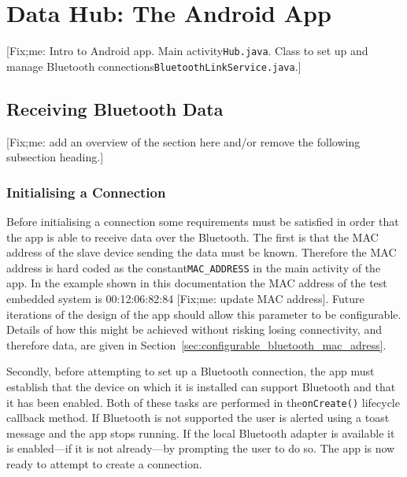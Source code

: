 \documentclass[11pt, a4paper, oneside, english]{scrbook}
\begin{document}
\chapter{Data Hub: The Android App} %
\label{cha:data_hub}
[Fix;me: Intro to Android app. Main activity\lstinline{Hub.java}. Class to set up and manage Bluetooth connections\lstinline{BluetoothLinkService.java}.]
\section{Receiving Bluetooth Data} %
\label{sec:receiving_bluetooth_data}
[Fix;me: add an overview of the section here and/or remove the following subsection heading.]
\subsection{Initialising a Connection} %
\label{sub:initialising_a_connection}
Before initialising a connection some requirements must be satisfied in order that the app is able to receive data over the Bluetooth. The first is that the MAC address of the slave device sending the data must be known. Therefore the MAC address is hard coded as the constant\lstinline{MAC_ADDRESS} in the main activity of the app. In the example shown in this documentation the MAC address of the test embedded system is 00:12:06:82:84 [Fix;me: update MAC address]. Future iterations of the design of the app should allow this parameter to be configurable. Details of how this might be achieved without risking losing connectivity, and therefore data, are given in Section~\ref{sec:configurable_bluetooth_mac_adress}.

Secondly, before attempting to set up a Bluetooth connection, the app must establish that the device on which it is installed can support Bluetooth and that it has been enabled. Both of these tasks are performed in the\lstinline{onCreate()} lifecycle callback method. If Bluetooth is not supported the user is alerted using a toast message and the app stops running. If the local Bluetooth adapter is available it is enabled---if it is not already---by prompting the user to do so. The app is now ready to attempt to create a connection. 
\end{document}
